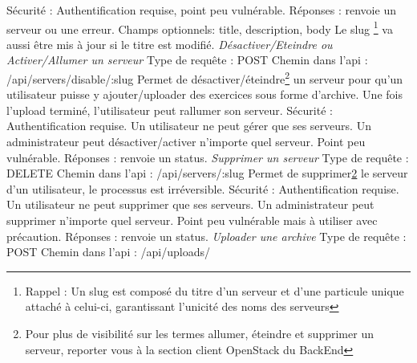 \documentclass{article}
\begin{document}
Sécurité : Authentification requise, point peu vulnérable.
\newline
Réponses : renvoie un serveur ou une erreur.
\newline
Champs optionnels: title, description, body
\newline
Le slug \footnote{\label{slug}Rappel : Un slug est composé du titre d'un serveur et d'une particule unique attaché à celui-ci, garantissant l'unicité des noms des serveurs} va aussi être mis à jour si le titre est modifié.
\newline
\newline
\textit{Désactiver/Eteindre ou Activer/Allumer un serveur}
\newline
Type de requête : POST
\newline
Chemin dans l'api : /api/servers/disable/:slug
\newline
Permet de désactiver/éteindre\footnote{\label{etat}Pour plus de visibilité sur les termes allumer, éteindre et supprimer un serveur, reporter vous à la section client OpenStack du BackEnd} un serveur pour qu'un utilisateur puisse y ajouter/uploader des exercices sous forme d'archive.
\newline
Une fois l'upload terminé, l'utilisateur peut rallumer son serveur.
\newline
Sécurité : Authentification requise. Un utilisateur ne peut gérer que ses serveurs. Un administrateur peut désactiver/activer n'importe quel serveur. Point peu vulnérable.
\newline
Réponses : renvoie un status.
\newline
\newline
\textit{Supprimer un serveur}
\newline
Type de requête : DELETE
\newline
Chemin dans l'api : /api/servers/:slug
\newline
Permet de supprimer\ref{etat} le serveur d'un utilisateur, le processus est irréversible.
\newline
Sécurité : Authentification requise. Un utilisateur ne peut supprimer que ses serveurs. Un administrateur peut supprimer n'importe quel serveur. Point peu vulnérable mais à utiliser avec précaution.
\newline
Réponses : renvoie un status.
\newline
\newline
\textit{Uploader une archive}
\newline
Type de requête : POST
\newline
Chemin dans l'api : /api/uploads/
\end{document}
